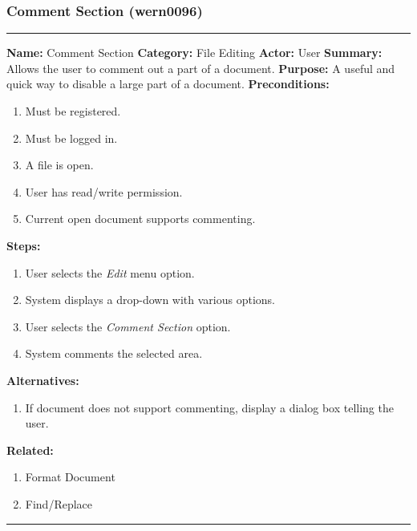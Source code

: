 \documentclass[11pt]{report}
\begin{document}
\subsubsection{Comment Section (wern0096)}
\vspace{2pt}
\hrule
\vspace{8pt}
	\noindent\textbf{Name:} Comment Section \newline
	\textbf{Category:} File Editing \newline
	\textbf{Actor:} User \newline
	\textbf{Summary:} Allows the user to comment out a part of a document. \newline
	\textbf{Purpose:} A useful and quick way to disable a large part of a document. \newline
	\textbf{Preconditions:}
	\begin{enumerate}
		\item Must be registered.
		\item Must be logged in.
		\item A file is open.
		\item User has read/write permission.
		\item Current open document supports commenting.
	\end{enumerate}
	\textbf{Steps:}
	\begin{enumerate}
		\item User selects the \textit{Edit} menu option.
		\item System displays a drop-down with various options.
		\item User selects the \textit{Comment Section} option.
		\item System comments the selected area.
	\end{enumerate}
	\textbf{Alternatives:}
	\begin{enumerate}
		\item If document does not support commenting, display a dialog box telling the user.
	\end{enumerate}
	\textbf{Related:}
	\begin{enumerate}
		\item Format Document
		\item Find/Replace
	\end{enumerate}
\vspace{8pt}
\hrule
\newpage
\end{document}
